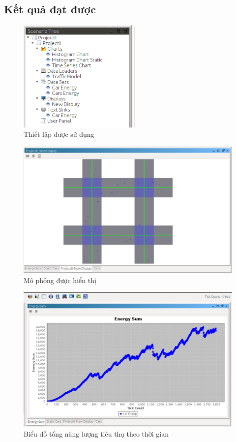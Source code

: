\documentclass[../report.tex]{subfiles}
\begin{document}
\subsection{Kết quả đạt được}
\begin{figure}[H]
\centering
\includegraphics[width=6cm]{figures/tree.png}
\caption{Thiết lập được sử dụng}
\end{figure}

\begin{figure}[H]
\centering
\includegraphics[width=\textwidth]{figures/render.png}
\caption{Mô phỏng được hiển thị}
\end{figure}

\begin{figure}[H]
\centering
\includegraphics[width=14cm]{figures/time-series.png}
\caption{Biểu đồ tổng năng lượng tiêu thụ theo thời gian}
\end{figure}
\end{document}
